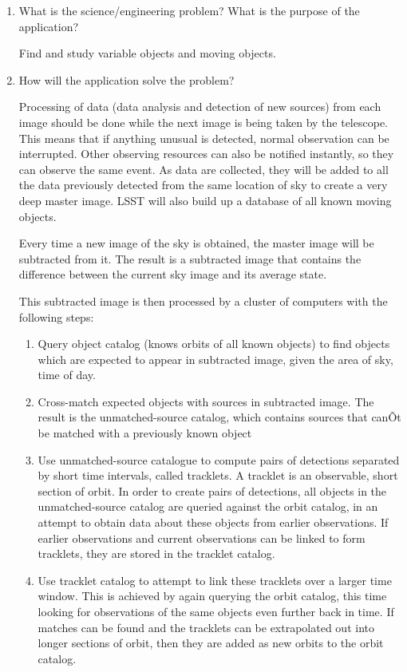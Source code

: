 \documentclass[preprint,12pt]{article}
\begin{document}
\begin{enumerate}
\item What is the science/engineering problem? What is the purpose of the application?

Find and study variable objects and moving objects.

\item How will the application solve the problem?

Processing of data (data analysis and detection of new sources) from each image should be done while the next image is being taken by the telescope.  This means that if anything unusual is detected, normal observation can be interrupted. Other observing resources can also be notified instantly, so they can observe the same event. As data are collected, they will be added to all the data previously detected from the same location of sky to create a very deep master image. LSST will also build up a database of all known moving objects.

Every time a new image of the sky is obtained, the master image will be subtracted from it. The result is a subtracted image that contains the difference between the current sky image and its average state.

This subtracted image is then processed by a cluster of computers with the following steps:
\begin{enumerate}

\item Query object catalog (knows orbits of all known objects) to find objects which are expected to appear in subtracted image, given the area of sky, time of day.

\item Cross-match expected objects with sources in subtracted image. The result is the unmatched-source catalog, which contains sources that canÕt be matched with a previously known object

\item Use unmatched-source catalogue to compute pairs of detections separated by short time intervals, called tracklets. A tracklet is an observable, short section of orbit. In order to create pairs of detections, all objects in the unmatched-source catalog are queried against the orbit catalog, in an attempt to obtain data about these objects from earlier observations. If earlier observations and current observations can be linked to form tracklets, they are stored in the tracklet catalog.

\item Use tracklet catalog to attempt to link these tracklets over a larger time window. This is achieved by again querying the orbit catalog, this time looking for observations of the same objects even further back in time. If matches can be found and the tracklets can be extrapolated out into longer sections of orbit, then they are added as new orbits to the orbit catalog.


\end{enumerate}
\end{enumerate}
\end{document}

